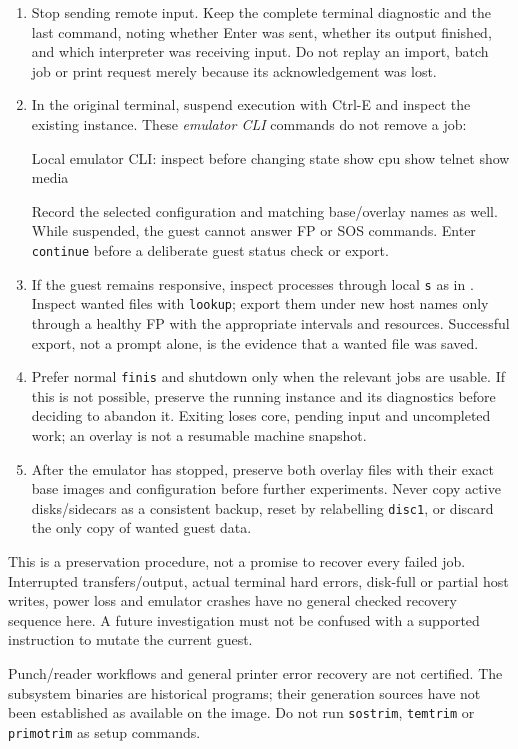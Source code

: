 \begin{enumerate}
\item Stop sending remote input. Keep the complete terminal diagnostic and
the last command, noting whether Enter was sent, whether its output finished,
and which interpreter was receiving input. Do not replay an import, batch job
or print request merely because its acknowledgement was lost.
\item In the original terminal, suspend execution with Ctrl-E and inspect
the existing instance. These \emph{emulator CLI} commands do not remove a job:
\begin{commandexample}{Local emulator CLI: inspect before changing state}
show cpu
show telnet
show media
\end{commandexample}
Record the selected configuration and matching base/overlay names as well.
While suspended, the guest cannot answer FP or SOS commands. Enter
\texttt{continue} before a deliberate guest status check or export.
\item If the guest remains responsive, inspect processes through local
\texttt{s} as in . Inspect
wanted files with \texttt{lookup}; export them under new host names only
through a healthy FP with the appropriate intervals and resources. Successful
export, not a prompt alone, is the evidence that a wanted file was saved.
\item Prefer normal \texttt{finis} and shutdown only when the relevant jobs
are usable. If this is not possible, preserve the running instance and its
diagnostics before deciding to abandon it. Exiting loses core, pending input
and uncompleted work; an overlay is not a resumable machine snapshot.
\item After the emulator has stopped, preserve both overlay files with
their exact base images and configuration before further experiments.
Never copy active disks/sidecars as a consistent backup, reset by relabelling
\texttt{disc1}, or discard the only copy of wanted guest data.
\end{enumerate}

This is a preservation procedure, not a promise to recover every failed job.
Interrupted transfers/output, actual terminal hard errors, disk-full or
partial host writes, power loss and emulator crashes have no general checked
recovery sequence here. A future investigation must not be confused with a
supported instruction to mutate the current guest.

Punch/reader workflows and general printer error recovery are not certified.
The subsystem binaries are historical programs; their generation sources have
not been established as available on the image. Do not run \texttt{sostrim},
\texttt{temtrim} or \texttt{primotrim} as setup commands.

